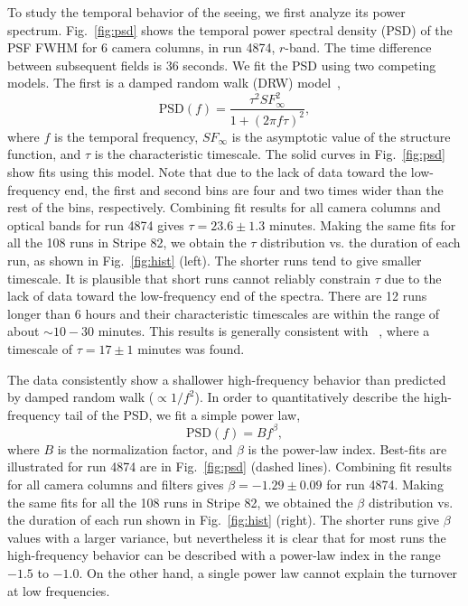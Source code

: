 To study the temporal behavior of the seeing, we first analyze its power spectrum.
Fig.~\ref{fig:psd} shows the temporal power spectral density (PSD) of the
PSF FWHM for 6 camera columns, in run 4874, $r$-band.
The time difference between subsequent fields is 36 seconds.
We fit the PSD using two competing models.
The first is a damped random walk (DRW) model~\citep[for introduction see Chapter 10 in][]{zeljkoBook},
\begin{equation}
\textrm{PSD}(f) = \frac{\tau^2 SF^2_{\infty}}{1+(2\pi f \tau)^2},
\end{equation}
where $f$ is the temporal frequency, $SF_{\infty}$ is the asymptotic
value of the structure function, and $\tau$ is the
characteristic timescale.
The solid curves in Fig.~\ref{fig:psd} show fits using this model.
Note that due to the lack of data toward the low-frequency end, the
first and second bins are four and two times wider than the
rest of the bins, respectively.
Combining fit results for all camera columns and optical bands for run 4874
gives $\tau = 23.6 \pm 1.3$ minutes.
Making the same fits for all the 108 runs in Stripe 82, 
we obtain the $\tau$ distribution vs. the duration of each
run, as shown in Fig.~\ref{fig:hist} (left).
The shorter runs tend to give smaller timescale. It is plausible that short runs 
cannot reliably constrain $\tau$ due to the lack of data toward the low-frequency 
end of the spectra. There are 12 runs longer than 6 hours and their characteristic timescales
are within the range of about $\sim10-30$ minutes.
This results is generally consistent with ~\cite{Racine1996}, where a timescale of 
$\tau = 17 \pm 1$ minutes was found.

The data consistently show a shallower high-frequency behavior than predicted
by damped random walk ($\propto 1/f^2$). In order to quantitatively describe 
the high-frequency tail of the PSD, we fit a simple power law,
\begin{equation}
\textrm{PSD}(f) = B f^\beta,
\end{equation}
where $B$ is the normalization factor, and $\beta$ is the power-law index.
Best-fits are illustrated for run 4874 are in Fig.~\ref{fig:psd} (dashed lines).
Combining fit results for all camera columns and filters gives $\beta = -1.29\pm 0.09$ 
for run 4874. Making the same fits for all the 108 runs in Stripe 82, we obtained the 
$\beta$ distribution vs. the duration of each run shown in Fig.~\ref{fig:hist} (right).
The shorter runs give $\beta$ values with a larger variance, but nevertheless it is 
clear that for most runs the high-frequency behavior can be described with a 
power-law index in the range $-1.5$ to $-1.0$. On the other hand, a single 
power law cannot explain the turnover at low frequencies. 

